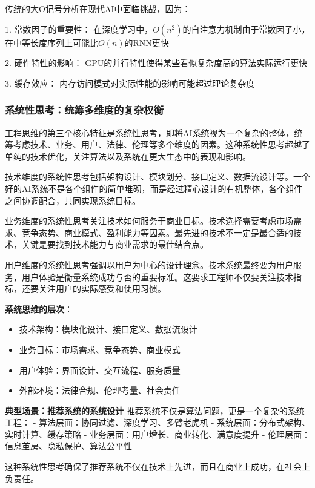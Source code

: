 
传统的大O记号分析在现代AI中面临挑战，因为：

1. 常数因子的重要性： 在深度学习中，$O(n^2)$的自注意力机制由于常数因子小，在中等长度序列上可能比$O(n)$的RNN更快

2. 硬件特性的影响： GPU的并行特性使得某些看似复杂度高的算法实际运行更快

3. 缓存效应： 内存访问模式对实际性能的影响可能超过理论复杂度


\subsubsection{系统性思考：统筹多维度的复杂权衡}

工程思维的第三个核心特征是系统性思考，即将AI系统视为一个复杂的整体，统筹考虑技术、业务、用户、法律、伦理等多个维度的因素。这种系统性思考超越了单纯的技术优化，关注算法以及系统在更大生态中的表现和影响。

技术维度的系统性思考包括架构设计、模块划分、接口定义、数据流设计等。一个好的AI系统不是各个组件的简单堆砌，而是经过精心设计的有机整体，各个组件之间协调配合，共同实现系统目标。

业务维度的系统性思考关注技术如何服务于商业目标。技术选择需要考虑市场需求、竞争态势、商业模式、盈利能力等因素。最先进的技术不一定是最合适的技术，关键是要找到技术能力与商业需求的最佳结合点。

用户维度的系统性思考强调以用户为中心的设计理念。技术系统最终要为用户服务，用户体验是衡量系统成功与否的重要标准。这要求工程师不仅要关注技术指标，还要关注用户的实际感受和使用习惯。

 \textbf{系统思维的层次}：
 \begin{itemize}
 \item 技术架构：模块化设计、接口定义、数据流设计
 \item 业务目标：市场需求、竞争态势、商业模式
 \item 用户体验：界面设计、交互流程、服务质量
 \item 外部环境：法律合规、伦理考量、社会责任
 \end{itemize}

\textbf{典型场景：推荐系统的系统设计}
推荐系统不仅是算法问题，更是一个复杂的系统工程：
- 算法层面：协同过滤、深度学习、多臂老虎机
- 系统层面：分布式架构、实时计算、缓存策略
- 业务层面：用户增长、商业转化、满意度提升
- 伦理层面：信息茧房、隐私保护、算法公平性

这种系统性思考确保了推荐系统不仅在技术上先进，而且在商业上成功，在社会上负责任。

